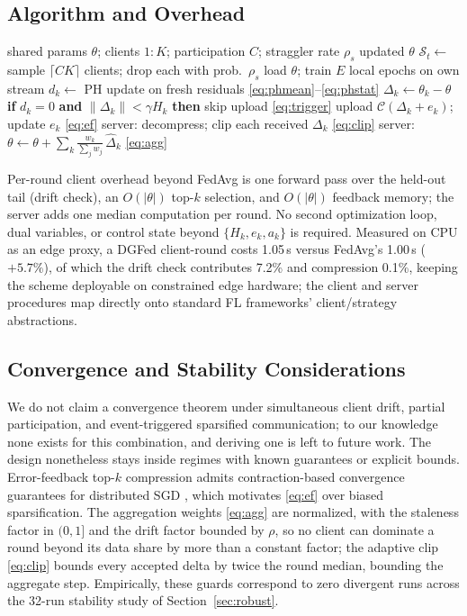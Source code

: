 \documentclass[journal]{IEEEtran}
\newcommand{\dgfed}{DGFed}
\begin{document}
\subsection{Algorithm and Overhead}
\begin{algorithm}[t]
\small
\caption{\dgfed{} (one round $t$)}
\label{alg:dgfed}
\begin{algorithmic}[1]
\REQUIRE shared params $\theta$; clients $1{:}K$; participation $C$; straggler rate $\rho_s$
\ENSURE updated $\theta$
\STATE $\mathcal{S}_t \leftarrow$ sample $\lceil C K \rceil$ clients; drop each with prob.\ $\rho_s$
  \STATE load $\theta$; train $E$ local epochs on own stream
  \STATE $d_k \leftarrow$ PH update on fresh residuals \hfill \eqref{eq:phmean}--\eqref{eq:phstat}
  \STATE $\Delta_k \leftarrow \theta_k - \theta$
  \STATE \textbf{if} $d_k = 0$ \textbf{and} $\lVert\Delta_k\rVert < \gamma H_k$ \textbf{then} skip upload \hfill \eqref{eq:trigger}
  \STATE upload $\mathcal{C}(\Delta_k + e_k)$; update $e_k$ \hfill \eqref{eq:ef}
\ENDFOR
\STATE server: decompress; clip each received $\Delta_k$ \hfill \eqref{eq:clip}
\STATE server: $\theta \leftarrow \theta + \sum_{k} \frac{w_k}{\sum_j w_j}\, \hat{\Delta}_k$ \hfill \eqref{eq:agg}
\end{algorithmic}
\end{algorithm}
Per-round client overhead beyond FedAvg is one forward pass over the held-out tail (drift check), an $O(|\theta|)$ top-$k$ selection, and $O(|\theta|)$ feedback memory; the server adds one median computation per round. No second optimization loop, dual variables, or control state beyond $\{H_k, e_k, a_k\}$ is required. Measured on CPU as an edge proxy, a \dgfed{} client-round costs 1.05\,s versus FedAvg's 1.00\,s ($+5.7\%$), of which the drift check contributes 7.2\% and compression 0.1\%, keeping the scheme deployable on constrained edge hardware; the client and server procedures map directly onto standard FL frameworks' client/strategy abstractions.

\subsection{Convergence and Stability Considerations}
We do not claim a convergence theorem under simultaneous client drift, partial participation, and event-triggered sparsified communication; to our knowledge none exists for this combination, and deriving one is left to future work. The design nonetheless stays inside regimes with known guarantees or explicit bounds. Error-feedback top-$k$ compression admits contraction-based convergence guarantees for distributed SGD \cite{karimireddy2019}, which motivates \eqref{eq:ef} over biased sparsification. The aggregation weights \eqref{eq:agg} are normalized, with the staleness factor in $(0,1]$ and the drift factor bounded by $\rho$, so no client can dominate a round beyond its data share by more than a constant factor; the adaptive clip \eqref{eq:clip} bounds every accepted delta by twice the round median, bounding the aggregate step. Empirically, these guards correspond to zero divergent runs across the 32-run stability study of Section~\ref{sec:robust}.
\end{document}
